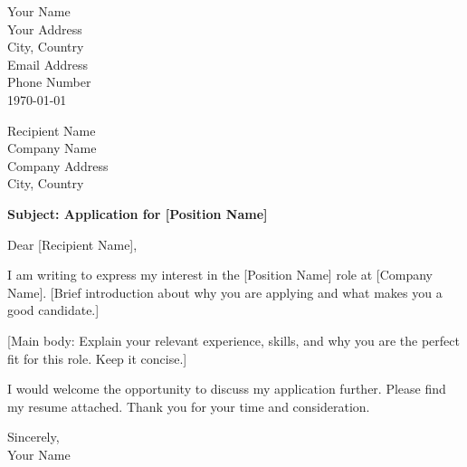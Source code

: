 \documentclass[a4paper,11pt]{article}
\begin{document}
\begin{flushright}
    Your Name\\
    Your Address\\
    City, Country\\
    Email Address\\
    Phone Number\\
    \today
\end{flushright}

\vspace{1cm}

Recipient Name\\
Company Name\\
Company Address\\
City, Country

\vspace{1cm}

\textbf{Subject: Application for [Position Name]}

\vspace{1cm}

Dear [Recipient Name],

I am writing to express my interest in the [Position Name] role at [Company Name]. [Brief introduction about why you are applying and what makes you a good candidate.]

[Main body: Explain your relevant experience, skills, and why you are the perfect fit for this role. Keep it concise.]

I would welcome the opportunity to discuss my application further. Please find my resume attached. Thank you for your time and consideration.

Sincerely,\\
\vspace{0.5cm}
Your Name
\end{document}
